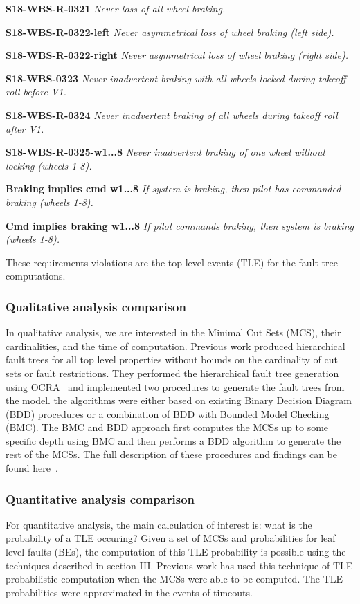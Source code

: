 \textbf{S18-WBS-R-0321} \textit{Never loss of all wheel braking.}

\textbf{S18-WBS-R-0322-left} \textit{Never asymmetrical loss of wheel braking (left side).}

\textbf{S18-WBS-R-0322-right} \textit{Never asymmetrical loss of wheel braking (right side).}

\textbf{S18-WBS-0323} \textit{Never inadvertent braking with all wheels locked during takeoff roll before V1.}

\textbf{S18-WBS-R-0324} \textit{Never inadvertent braking of all wheels during takeoff roll after V1.}

\textbf{S18-WBS-R-0325-w1...8} \textit{Never inadvertent braking of one wheel without locking (wheels 1-8).} 

\textbf{Braking implies cmd w1...8} \textit{If system is braking, then pilot has commanded braking (wheels 1-8).} 

\textbf{Cmd implies braking w1...8} \textit{If pilot commands braking, then system is braking (wheels 1-8).} 

These requirements violations are the top level events (TLE) for the fault tree computations. 


\subsubsection{Qualitative analysis comparison}
In qualitative analysis, we are interested in the Minimal Cut Sets (MCS), their cardinalities, and the time of computation. Previous work produced hierarchical fault trees for all top level properties without bounds on the cardinality of cut sets or fault restrictions. They performed the hierarchical fault tree generation using OCRA~\cite{6693137} and implemented two procedures to generate the fault trees from the model. the algorithms were either based on existing Binary Decision Diagram (BDD) procedures or a combination of BDD with Bounded Model Checking (BMC). The BMC and BDD approach first computes the MCSs up to some specific depth using BMC and then performs a BDD algorithm to generate the rest of the MCSs. The full description of these procedures and findings can be found here~\cite{10.1007/978-3-319-11936-6-7, mattareiThesis}. 

\subsubsection{Quantitative analysis comparison}
For quantitative analysis, the main calculation of interest is: what is the probability of a TLE occuring? Given a set of MCSs and probabilities for leaf level faults (BEs), the computation of this TLE probability is possible using the techniques described in section III. Previous work has used this technique of TLE probabilistic computation when the MCSs were able to be computed. The TLE probabilities were approximated in the events of timeouts. 
